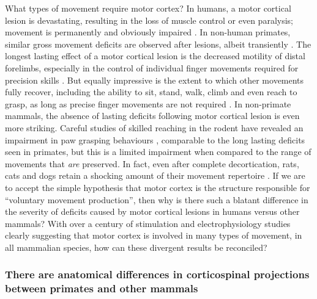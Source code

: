 What types of movement require motor cortex? In humans, a motor cortical lesion is devastating, resulting in the loss of muscle control or even paralysis; movement is permanently and obviously impaired \cite{Laplane1977}. In non-human primates, similar gross movement deficits are observed after lesions, albeit transiently \cite{Leyton1917}. The longest lasting effect of a motor cortical lesion is the decreased motility of distal forelimbs, especially in the control of individual finger movements required for precision skills \cite{Leyton1917,Darling2011}. But equally impressive is the extent to which other movements fully recover, including the ability to sit, stand, walk, climb and even reach to grasp, as long as precise finger movements are not required \cite{Leyton1917,Darling2011,Zaaimi2012}. In non-primate mammals, the absence of lasting deficits following motor cortical lesion is even more striking. Careful studies of skilled reaching in the rodent have revealed an impairment in paw grasping behaviours \cite{Alaverdashvili2008a}, comparable to the long lasting deficits seen in primates, but this is a limited impairment when compared to the range of movements that \emph{are} preserved. In fact, even after complete decortication, rats, cats and dogs retain a shocking amount of their movement repertoire \cite{Bjursten1976,Terry1989}. If we are to accept the simple hypothesis that motor cortex is the structure responsible for ``voluntary movement production'', then why is there such a blatant difference in the severity of deficits caused by motor cortical lesions in humans versus other mammals? With over a century of stimulation and electrophysiology studies clearly suggesting that motor cortex is involved in many types of movement, in all mammalian species, how can these divergent results be reconciled?

\subsubsection*{There are anatomical differences in corticospinal projections between primates and other mammals}

